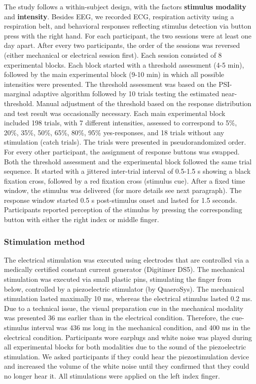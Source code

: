 \documentclass[11pt,a4paper,onecolumn]{article}
\begin{document}
The study follows a within-subject design, with the factors \textbf{stimulus modality} and \textbf{intensity}. Besides EEG, we recorded ECG, respiration activity using a respiration belt, and behavioral responses reflecting stimulus detection via button press with the right hand. For each participant, the two sessions were at least one day apart. After every two participants, the order of the sessions was reversed (either mechanical or electrical session first). Each session consisted of 8 experimental blocks. Each block started with a threshold assessment (4-5 min), followed by the main experimental block (9-10 min) in which all possible intensities were presented. The threshold assessment was based on the PSI-marginal adaptive algorithm \cite{prinsPsimarginalAdaptiveMethod2013} followed by 10 trials testing the estimated near-threshold. Manual adjustment of the threshold based on the response distribution and test result was occasionally necessary.
Each main experimental block included 198 trials, with 7 different intensities, assessed to correspond to 5\%, 20\%, 35\%, 50\%, 65\%, 80\%, 95\% yes-responses, and 18 trials without any stimulation (catch trials). The trials were presented in pseudorandomized order. For every other participant, the assignment of response buttons was swapped. Both the threshold assessment and the experimental block followed the same trial sequence. It started with a jittered inter-trial interval of 0.5-1.5 s showing a black fixation cross, followed by a red fixation cross (stimulus cue). After a fixed time window, the stimulus  was delivered (for more details see next paragraph). The response window started 0.5 s post-stimulus onset and lasted for 1.5 seconds. Participants reported perception of the stimulus by pressing the corresponding button with either the right index or middle finger.
\subsubsection*{Stimulation method}\label{Stimulation method}
\vspace{-7pt}

The electrical stimulation was executed using electrodes that are controlled via a medically certified constant current generator (Digitimer DS5). The mechanical stimulation was executed via small plastic pins, stimulating the finger from below, controlled by a piezoelectric stimulator (by QuaeroSys). The mechanical stimulation lasted maximally 10 ms, whereas the electrical stimulus lasted 0.2 ms.
Due to a technical issue, the visual preparation cue in the mechanical modality was presented 36 ms earlier than in the electrical condition. Therefore, the cue-stimulus interval was 436 ms long in the mechanical condition, and 400 ms in the electrical condition. Participants wore earplugs and white noise was played during all experimental blocks for both modalities due to the sound of the piezoelectric stimulation. We asked participants if they could hear the piezostimulation device and increased the volume of the white noise until they confirmed that they could no longer hear it. All stimulations were applied on the left index finger.
\end{document}
